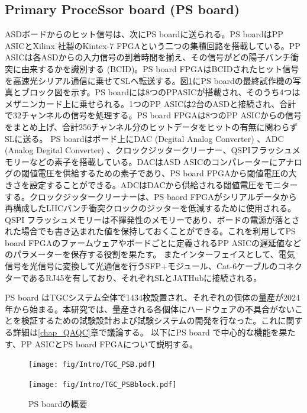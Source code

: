         \subsection*{Primary ProceSsor board (PS board)}
    ASDボードからのヒット信号は、次にPS boardに送られる。PS boardはPP ASICとXilinx 社製のKintex-7 FPGAという二つの集積回路を搭載している。PP ASICは各ASDからの入力信号の到着時間を揃え、その信号がどの陽子バンチ衝突に由来するかを識別する (BCID)。PS board FPGAはBCIDされたヒット信号を高速光シリアル通信に乗せてSLへ転送する。図\ref{TGC_PSB}にPS boardの最終試作機の写真とブロック図を示す。PS boardには8つのPPASICが搭載され、そのうち4つはメザニンカード上に乗せられる。1つのPP ASICは2台のASDと接続され、合計で32チャンネルの信号を処理する。PS board FPGAは8つのPP ASICからの信号をまとめ上げ、合計256チャンネル分のヒットデータをヒットの有無に関わらずSLに送る。
    PS boardはボード上にDAC  (Degital Analog Converter) 、ADC  (Analog Degital Converter) 、クロックジッタークリーナー、QSPIフラッシュメモリーなどの素子を搭載している。DACはASD ASICのコンパレーターにアナログの閾値電圧を供給するための素子であり、PS board FPGAから閾値電圧の大きさを設定することができる。ADCはDACから供給される閾値電圧をモニターする。クロックジッタークリーナーは、PS baord FPGAがシリアルデータから再構成したLHCバンチ衝突クロックのジッターを低減するために使用される。QSPI フラッシュメモリーは不揮発性のメモリーであり、ボードの電源が落とされた場合でも書き込まれた値を保持しておくことができる。これを利用してPS board FPGAのファームウェアやボードごとに定義されるPP ASICの遅延値などのパラメーターを保存する役割を果たす。
    またインターフェイスとして、電気信号を光信号に変換して光通信を行うSFP+モジュール、Cat-6ケーブルのコネクターであるRJ45を有しており、それぞれSLとJATHubに接続される。
    
    PS board はTGCシステム全体で1434枚設置され、それぞれの個体の量産が2024年から始まる。本研究では、量産される各個体にハードウェアの不具合がないことを検証するための試験設計および試験システムの開発を行なった。これに関する詳細は\ref{chap_QAQC}章で議論する。
    以下にPS board で中心的な機能を果たす、PP ASICとPS board FPGAについて説明する。

    \begin{figure}
    \begin{minipage}[b]{.5\linewidth}
    \centering
    \texttt{[image: fig/Intro/TGC\_PSB.pdf]}
    \end{minipage}%
    \begin{minipage}[b]{.5\linewidth}
    \centering
    \texttt{[image: fig/Intro/TGC\_PSBblock.pdf]}
    \end{minipage}%
    \caption[PS boardの概要]{PS boardの概要}
    \label{TGC_PSB}
    \end{figure}

